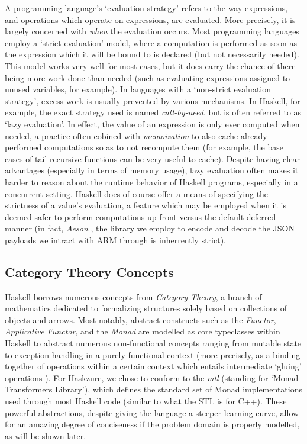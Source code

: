 \documentclass[11pt]{report}
\begin{document}
A programming language's `evaluation strategy' refers to the way expressions,
and operations which operate on expressions, are evaluated. More precisely, it is
largely concerned with \textit{when} the evaluation occurs. Most programming
languages employ a `strict evaluation' model, where a computation is performed
as soon as the expression which it will be bound to is declared (but not
necessarily needed). This model works very well for most cases, but it does
carry the chance of there being more work done than needed (such as evaluating
expressions assigned to unused variables, for example). \newline
In languages with a `non-strict evaluation strategy', excess work is usually
prevented by various mechanisms. In Haskell, for example, the exact strategy
used is named \textit{call-by-need}, but is often referred to as `lazy
evaluation'. In effect, the value of an expression is only ever computed when
needed, a practice often cobined with \textit{memoization} to also cache
already performed computations so as to not recompute them (for example, the
base cases of tail-recursive functions can be very useful to cache). \newline
Despite having clear advantages (especially in terms of memory usage), lazy
evaluation often makes it harder to reason about the runtime behavior of
Haskell programs, especially in a concurrent \cite{concurrenthaskell} setting.
Haskell does of course offer a means of specifying the strictness of a value's
evaluation, a feature which may be employed when it is deemed safer to perform
computations up-front versus the default deferred manner (in fact,
\textit{Aeson} \cite{aeson}, the library we employ to encode and decode the
JSON payloads we intract with ARM through is inherrently strict).

\subsection{Category Theory Concepts}

Haskell borrows numerous concepts from \textit{Category Theory}, a branch of
mathematics dedicated to formalizing structures solely based on collections of
objects and arrows. Most notably, abstract constructs such as the
\textit{Functor}, \textit{Applicative Functor}, and the \textit{Monad}
are modelled as core typeclasses within Haskell to abstract numerous
non-functional concepts ranging from mutable state to exception handling
in a purely functional context (more precisely, as a binding together
of operations within a certain context which entails intermediate `gluing'
operations \cite{learnyouahaskell}). For Haskzure, we chose
to conform to the \textit{mtl} (standing for `Monad Transformers Library'),
which defines the standard set of Monad implementations used through most
Haskell code (similar to what the STL is for C++).
These powerful abstractions, despite giving the language a steeper
learning curve, allow for an amazing degree of conciseness if the problem
domain is properly modelled, as will be shown later.
\end{document}
